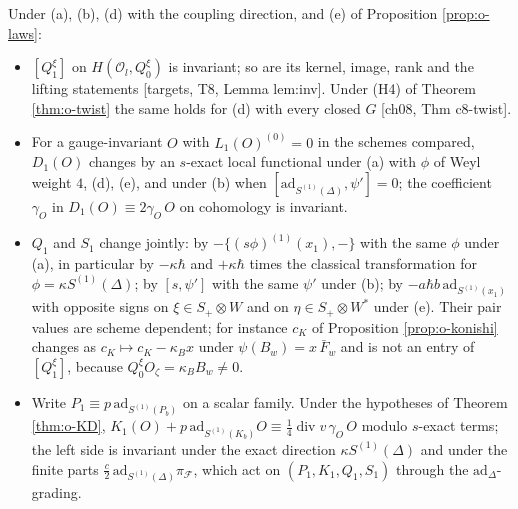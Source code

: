 \begin{theorem}
\label{thm:o-invariants}
Under (a), (b), (d) with the coupling direction, and (e) of Proposition \ref{prop:o-laws}:
\begin{itemize}
\item[(i)] $[Q^\xi_1]$ on $H(\mathscr O_l,Q^\xi_0)$ is invariant; so are its kernel, image, rank and the lifting statements [targets, T8, Lemma lem:inv]. Under (H4) of Theorem \ref{thm:o-twist} the same holds for (d) with every closed $G$ [ch08, Thm c8-twist].
\item[(ii)] For a gauge-invariant $O$ with $L_1(O)^{(0)}=0$ in the schemes compared, $D_1(O)$ changes by an $s$-exact local functional under (a) with $\phi$ of Weyl weight $4$, (d), (e), and under (b) when $[\mathrm{ad}_{S^{(1)}(\Delta)},\psi']=0$; the coefficient $\gamma_O$ in $D_1(O)\equiv2\gamma_O\,O$ on cohomology is invariant.
\item[(iii)] $Q_1$ and $S_1$ change jointly: by $-\{(s\phi)^{(1)}(x_1),-\}$ with the same $\phi$ under (a), in particular by $-\kappa\hbar$ and $+\kappa\hbar$ times the classical transformation for $\phi=\kappa S^{(1)}(\Delta)$; by $[s,\psi']$ with the same $\psi'$ under (b); by $-a\hbar b\,\mathrm{ad}_{S^{(1)}(x_1)}$ with opposite signs on $\xi\in S_+\otimes W$ and on $\eta\in S_+\otimes W^*$ under (e). Their pair values are scheme dependent; for instance $c_K$ of Proposition \ref{prop:o-konishi} changes as $c_K\mapsto c_K-\kappa_Bx$ under $\psi(B_w)=x\,\bar F_w$ and is not an entry of $[Q^\xi_1]$, because $Q^\xi_0O_\zeta=\kappa_BB_w\neq0$.
\item[(iv)] Write $P_1\equiv p\,\mathrm{ad}_{S^{(1)}(P_b)}$ on a scalar family. Under the hypotheses of Theorem \ref{thm:o-KD}, $K_1(O)+p\,\mathrm{ad}_{S^{(1)}(K_b)}O\equiv\tfrac14\operatorname{div}v\,\gamma_O\,O$ modulo $s$-exact terms; the left side is invariant under the exact direction $\kappa S^{(1)}(\Delta)$ and under the finite parts $\tfrac c2\,\mathrm{ad}_{S^{(1)}(\Delta)}\pi_{\mathcal F}$, which act on $(P_1,K_1,Q_1,S_1)$ through the $\mathrm{ad}_\Delta$-grading.
\end{itemize}
\end{theorem}

